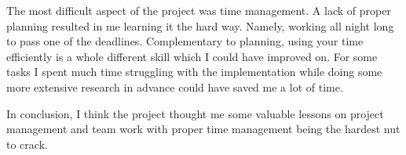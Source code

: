 The most difficult aspect of the project was time management. A lack of proper planning resulted in me learning it the hard way. Namely, working all night long to pass one of the deadlines.
Complementary to planning, using your time efficiently is a whole different skill which I could have improved on. For some tasks I spent much time struggling with the implementation while doing some more extensive research in advance could have saved me a lot of time.

In conclusion, I think the project thought me some valuable lessons on project management and team work with proper time management being the hardest nut to crack.
